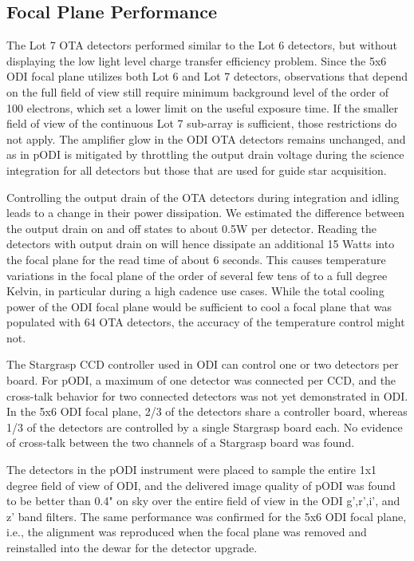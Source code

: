 \documentclass[]{spieman}
\begin{document}
\subsection{Focal Plane  Performance}


The Lot 7 OTA detectors performed similar to the Lot 6 detectors,
but without displaying the low light level charge transfer efficiency problem. 
Since the 5x6 ODI focal plane utilizes both Lot 6 and Lot 7 detectors, observations that
depend on the full field of view still require minimum background level of the
order of 100 electrons, which set a lower limit on the useful exposure time.
If the smaller field of view of the continuous Lot 7
sub-array is sufficient, those restrictions do not apply. The amplifier glow
in the ODI OTA detectors remains unchanged, and as in pODI is mitigated by throttling 
the output drain voltage during the science integration for all detectors but those
that are used for guide star acquisition.

Controlling the output drain of the OTA detectors during integration and idling
leads to a change in their power dissipation. We estimated the difference
between the output drain on and off states to about 0.5W per detector. Reading the
detectors with output drain on will hence dissipate an additional 15 Watts into
the focal plane for the read time of about 6 seconds. This causes temperature
variations in the focal plane of the order of several  few tens of to a full
degree Kelvin, in particular during a high cadence use cases. While the total cooling
power of the ODI focal plane would be sufficient to cool a focal plane that was
populated with 64 OTA detectors, the accuracy of the temperature control might not. 


The Stargrasp CCD controller\cite{onaka2008} used in ODI can control one or two
detectors per board. For pODI, a maximum of one detector was connected per CCD,
and the cross-talk behavior for two connected detectors was not yet
demonstrated in ODI. In the 5x6 ODI focal plane, 2/3 of the detectors share a
controller board, whereas 1/3 of the detectors are controlled by a single
Stargrasp board each. No evidence of cross-talk between the two channels of a
Stargrasp board was found.

The detectors in the pODI instrument were placed to sample the entire 1x1 degree
field of view of ODI, and the delivered image quality of pODI was found to be
better than 0.4" on sky over the entire field of view in the ODI g',r',i', and
z' band filters. The same performance was confirmed for the 5x6 ODI focal plane,
i.e., the alignment was reproduced when the focal plane was removed and reinstalled into
the dewar for the detector upgrade.
\end{document}

